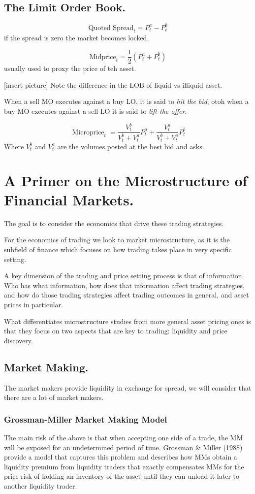 \documentclass[11pt,a4paper]{article}
\theoremstyle{definition}
\theoremstyle{plain}
\theoremstyle{remark}
\newcommand{\1}{\mathbbm{1}}
\begin{document}
\subsection{The Limit Order Book.} 
$$\text{Quoted Spread}_t = P_t^a - P_t^b$$
if the spread is zero the market becomes locked. 

$$\text{Midprice}_t = \frac{1}{2} (P_t^a + P_t^b)$$
usually used to proxy the price of teh asset. 

[insert picture]
Note the difference in the LOB of liquid vs illiquid asset. 

When a sell MO executes against a buy LO, it is said to \emph{hit the bid}; 
otoh when a buy MO executes against a sell LO it is said to \emph{lift the offer}. 

$$\operatorname{Microprice}_t = \frac{V_t^b}{V_t^b + V_t^a} P_t^a + \frac{V_t^a}{V_t^b + V_t^a} P_t^b$$
Where $V_t^b$ and $V_t^a$ are the volumes posted at the best bid and asks. 

\section{A Primer on the Microstructure of Financial Markets.} 
The goal is to consider the economics that drive these trading strategies. 

For the economics of trading we look to market microstructure, as it is the 
subfield of finance which focuses on how trading takes place in very specific 
setting. 

A key dimension of the trading and price setting process is that of information. Who has what information, how does that information affect trading strategies, 
and how do those trading strategies affect trading outcomes in general, and asset prices in particular.

What differentiates microstructure studies from more general 
asset pricing ones is that they focus on two aspects that are key to trading: 
liquidity and price discovery.

\subsection{Market Making.} 
The market makers provide liquidity in exchange for spread, we will consider that there are a lot of market makers. 

\subsubsection{Grossman-Miller Market Making Model}
The main risk of the above is that when accepting one side of a trade, the MM will be exposed for an undetermined period of time. 
Grossman \& Miller (1988) provide a model that captures this problem and describes how 
MMs obtain a liquidity premium from liquidity traders that exactly compensates 
MMs for the price risk of holding an inventory of the asset until they can unload 
it later to another liquidity trader. 
\end{document}
